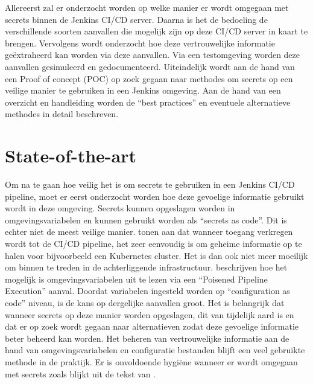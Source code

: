 Allereerst zal er onderzocht worden op welke manier er wordt omgegaan met secrets binnen de Jenkins CI/CD server. Daarna is het de bedoeling de verschillende soorten aanvallen die mogelijk zijn op deze CI/CD server in kaart te brengen. Vervolgens wordt onderzocht hoe deze vertrouwelijke informatie geëxtraheerd kan worden via deze aanvallen. Via een testomgeving worden deze aanvallen gesimuleerd en gedocumenteerd. Uiteindelijk wordt aan de hand van een Proof of concept (POC) op zoek gegaan naar methodes om secrets op een veilige manier te gebruiken in een Jenkins omgeving. Aan de hand van een overzicht en handleiding worden de “best practices” en eventuele alternatieve methodes in detail beschreven.

\section{State-of-the-art}%
\label{sec:state-of-the-art}

Om na te gaan hoe veilig het is om secrets te gebruiken in een Jenkins CI/CD pipeline, moet er eerst onderzocht worden hoe deze gevoelige informatie gebruikt wordt in deze omgeving. Secrets kunnen opgeslagen worden in omgevingsvariabelen en kunnen gebruikt worden als “secrets as code”. Dit is echter niet de meest veilige manier. \textcite{Pecka2022} tonen aan dat wanneer toegang verkregen wordt tot de CI/CD pipeline, het zeer eenvoudig is om geheime informatie op te halen voor bijvoorbeeld een Kubernetes cluster. Het is dan ook niet meer moeilijk om binnen te treden in de achterliggende infrastructuur. \textcite{Gil} beschrijven hoe het mogelijk is omgevingsvariabelen uit te lezen via een “Poisened Pipeline Execution” aanval. Doordat variabelen ingesteld worden op “configuration as code” niveau, is de kans op dergelijke aanvallen groot. Het is belangrijk dat wanneer secrets op deze manier worden opgeslagen, dit van tijdelijk aard is en dat er op zoek wordt gegaan naar alternatieven zodat deze gevoelige informatie beter beheerd kan worden. Het beheren van vertrouwelijke informatie aan de hand van omgevingsvariabelen en configuratie bestanden blijft een veel gebruikte methode in de praktijk. Er is onvoldoende hygiëne wanneer er wordt omgegaan met secrets zoals blijkt uit de tekst van \autocite{Gil}. 

